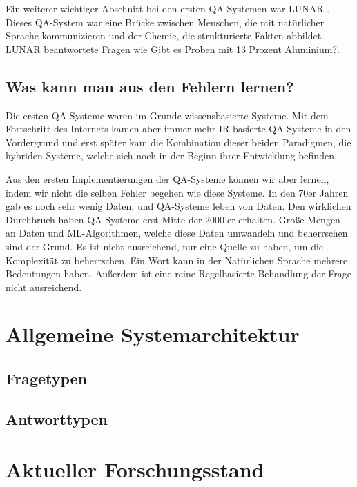 \documentclass[
        ngerman,
        paper=a4,
        numbers=noendperiod,
]{scrreprt}
\begin{document}
Ein weiterer wichtiger Abschnitt bei den ersten QA-Systemen war \glqq LUNAR\grqq{} \citep{Woods1978SemanticsAnswering}. Dieses QA-System war eine Brücke zwischen Menschen, die mit natürlicher Sprache kommunizieren und der Chemie, die strukturierte Fakten abbildet. LUNAR beantwortete  Fragen wie \glqq Gibt es Proben mit 13 Prozent Aluminium?\grqq{}. 

\subsection{Was kann man aus den Fehlern lernen?}
Die ersten QA-Systeme waren im Grunde wissensbasierte Systeme. Mit dem Fortschritt des Internets kamen aber immer mehr IR-basierte QA-Systeme in den Vordergrund und erst später kam die Kombination dieser beiden Paradigmen, die hybriden Systeme, welche sich noch in der Beginn ihrer Entwicklung befinden. 

Aus den ersten Implementierungen der QA-Systeme können wir aber lernen, indem wir nicht die selben Fehler begehen wie diese Systeme. In den 70er Jahren gab es noch sehr wenig Daten, und QA-Systeme leben von Daten. Den wirklichen Durchbruch haben QA-Systeme erst Mitte der 2000'er erhalten. Große Mengen an Daten und ML-Algorithmen, welche diese Daten umwandeln und beherrschen sind der Grund. Es ist nicht ausreichend, nur eine Quelle zu haben, um die Komplexität zu beherrschen. Ein Wort kann in der Natürlichen Sprache mehrere Bedeutungen haben. Außerdem ist eine reine Regelbasierte Behandlung der Frage nicht ausreichend.

\section{Allgemeine Systemarchitektur} %
\subsection{Fragetypen}
\subsection{Antworttypen}
\section{Aktueller Forschungsstand} %
\end{document}
